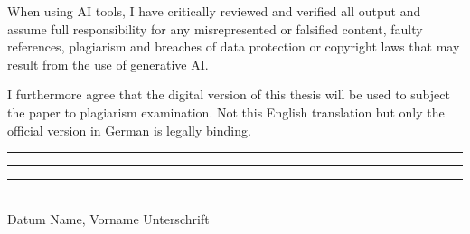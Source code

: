 \noindent
When using AI tools, I have critically reviewed and verified all output and assume full responsibility for any misrepresented or
falsified content, faulty references, plagiarism and breaches of data protection or copyright laws that may result from the use of
generative AI.

\noindent
I furthermore agree that the digital version of this thesis will be used to subject the paper to plagiarism examination.
Not this English translation but only the official version in German is legally binding.

\vspace{1cm}
\noindent
\rule{30mm}{0.1pt} \hfill{} \rule{45mm}{0.1pt} \hfill{} \rule{35mm}{0.1pt}\\
Datum \hfill{} Name, Vorname \hfill{} Unterschrift

